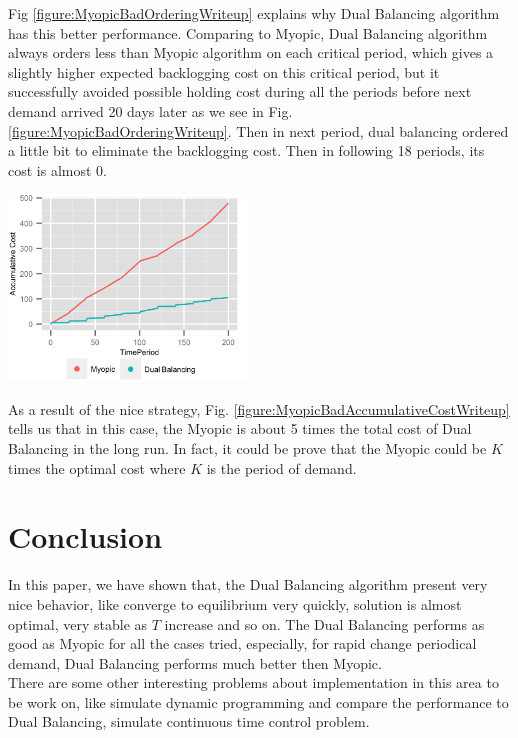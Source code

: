 \documentclass[twoside]{article}
\begin{document}
\begin{multicols}{2}
\begin{center}
  \end{center}
  Fig \ref{figure:MyopicBadOrderingWriteup} explains why Dual Balancing algorithm has this better performance. Comparing to Myopic, Dual Balancing algorithm always orders less than Myopic algorithm on each critical period, which gives a slightly higher expected backlogging cost on this critical period, but it successfully avoided possible holding cost during all the periods before next demand arrived 20 days later as we see in Fig. \ref{figure:MyopicBadOrderingWriteup}. Then in next period, dual balancing ordered a little bit to eliminate the backlogging cost. Then in following 18 periods, its cost is almost 0.

  \begin{center}
    \label{figure:MyopicBadAccumulativeCostWriteup}
    \includegraphics[width=2.5in]{figures/MyopicBadAccumulativeCostWriteup.png}
  \end{center}
  As a result of the nice strategy, Fig. \ref{figure:MyopicBadAccumulativeCostWriteup} tells us that in this case, the Myopic is about 5 times the total cost of Dual Balancing in the long run. In fact, it could be prove that the Myopic could be $K$ times the optimal cost where $K$ is the period of demand.

\section{Conclusion}

In this paper, we have shown that, the Dual Balancing algorithm present very nice behavior, like converge to equilibrium very quickly, solution is almost optimal, very stable as $T$ increase and so on. The Dual Balancing performs as good as Myopic for all the cases tried, especially, for rapid change periodical demand, Dual Balancing performs much better then Myopic.\\
There are some other interesting problems about implementation in this area to be work on, like simulate dynamic programming and compare the performance to Dual Balancing, simulate continuous time control problem.


\end{multicols}
\end{document}
